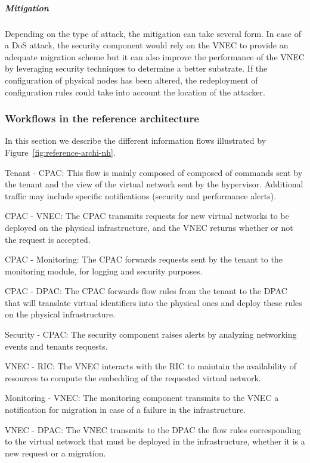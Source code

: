 \subparagraph{Mitigation}
Depending on the type of attack, the mitigation can take several form. 
In case of a DoS attack, the security component would rely on the VNEC to provide an adequate migration scheme but it can also improve the performance of the VNEC by leveraging security techniques to determine a better substrate. 
If the configuration of physical nodes has been altered, the redeployment of configuration rules could take into account the location of the attacker.

\subsubsection{Workflows in the reference architecture}
In this section we describe the different information flows illustrated by Figure~\ref{fig:reference-archi-nh}.

 Tenant - CPAC: This flow is mainly composed of composed of commands sent by the tenant and the view of the virtual network sent by the hypervisor. Additional traffic may include specific notifications (\eg security and performance alerts).

 CPAC - VNEC: The CPAC transmits requests for new virtual networks to be deployed on the physical infrastructure, and the VNEC returns whether or not the request is accepted.

 CPAC - Monitoring: The CPAC forwards requests sent by the tenant to the monitoring module, for logging and security purposes. 

 CPAC - DPAC: The CPAC forwards flow rules from the tenant to the DPAC that will translate virtual identifiers into the physical ones and deploy these rules on the physical infrastructure.

 Security - CPAC: The security component raises alerts by analyzing networking events and tenants requests.

 VNEC - RIC: The VNEC interacts with the RIC to maintain the availability of resources to compute the embedding of the requested virtual network.

 Monitoring - VNEC: The monitoring component transmits to the VNEC a notification for migration in case of a failure in the infrastructure.

 VNEC - DPAC: The VNEC transmits to the DPAC the flow rules corresponding to the virtual network that must be deployed in the infrastructure, whether it is a new request or a migration.

